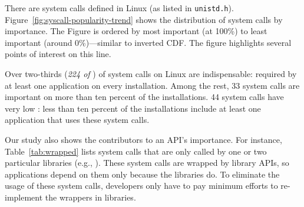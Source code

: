 There are \syscallnum{} system calls defined in \osarch{} Linux  (as listed in {\tt unistd.h}). 
Figure~\ref{fig:syscall-popularity-trend} shows the 
distribution of system calls by importance.
The Figure is ordered by most important (at 100\%) to least important (around 0\%)---similar
to inverted CDF.
The figure highlights several points of interest on this line.

Over two-thirds ({\em 224 of \syscallnum{}}) 
of system calls on Linux are indispensable:
required by 
at least one application on every installation.
Among the rest, 33 system calls are important on more than ten percent of the installations.
44 system calls have very low \usagemetric{}:
less than ten percent of the installations include at least one application
that uses these system calls.

Our study also shows the contributors
to an API's importance. %
For instance, Table~\ref{tab:wrapped} lists system calls that are
only called by one or two particular libraries
(e.g., \libc{}).
These system calls are wrapped by library APIs,
so applications depend on them only because the libraries do.
To eliminate the usage of these system calls,
developers only have to pay minimum efforts to re-implement the wrappers in libraries.

